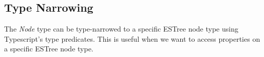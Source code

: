 \subsection{Type Narrowing}

The \textit{Node} type can be type-narrowed\parencite{typeNarrowing} to a specific ESTree node type using Typescript's type predicates. This is useful when we want to access properties on a specific ESTree node type.

